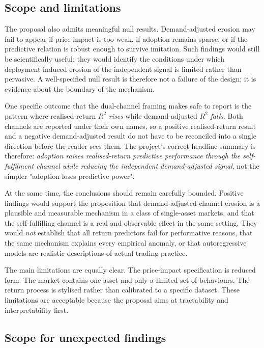 \documentclass[11pt]{article}
\begin{document}
\subsection{Scope and limitations}

The proposal also admits meaningful null results. Demand-adjusted erosion may fail to appear if price impact is too weak, if adoption remains sparse, or if the predictive relation is robust enough to survive imitation. Such findings would still be scientifically useful: they would identify the conditions under which deployment-induced erosion of the independent signal is limited rather than pervasive. A well-specified null result is therefore not a failure of the design; it is evidence about the boundary of the mechanism.

One specific outcome that the dual-channel framing makes safe to report is the pattern where realised-return $R^{2}$ \emph{rises} while demand-adjusted $R^{2}$ \emph{falls}. Both channels are reported under their own names, so a positive realised-return result and a negative demand-adjusted result do not have to be reconciled into a single direction before the reader sees them. The project's correct headline summary is therefore: \emph{adoption raises realised-return predictive performance through the self-fulfilment channel while reducing the independent demand-adjusted signal}, not the simpler "adoption loses predictive power".

At the same time, the conclusions should remain carefully bounded. Positive findings would support the proposition that demand-adjusted-channel erosion is a plausible and measurable mechanism in a class of single-asset markets, and that the self-fulfilling channel is a real and observable effect in the same setting. They would \emph{not} establish that all return predictors fail for performative reasons, that the same mechanism explains every empirical anomaly, or that autoregressive models are realistic descriptions of actual trading practice.

The main limitations are equally clear. The price-impact specification is reduced form. The market contains one asset and only a limited set of behaviours. The return process is stylised rather than calibrated to a specific dataset. These limitations are acceptable because the proposal aims at tractability and interpretability first.

\subsection{Scope for unexpected findings}
\end{document}
